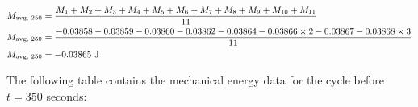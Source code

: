\documentclass[titlepage]{article}
\begin{document}
            \begin{equation}
                \small
                \begin{aligned}
                    M_{\text{avg, 250}} &= \frac{M_1 + M_2 + M_3 + M_4 + M_5 + M_6 + M_7 + M_8 + M_9 + M_{10} + M_{11}}{11} \\
                    M_{\text{avg, 250}} &= \frac{-0.03858 -0.03859 -0.03860 -0.03862 -0.03864 -0.03866 \times 2 -0.03867 -0.03868 \times 3 }{11} \\
                    M_{\text{avg, 250}} &= -0.03865 \text{ J} \\
                \end{aligned}\label{eq:average-mechanical-energy-cycle-at-250-seconds}
            \end{equation}
            
            The following table contains the mechanical energy data for the cycle before $t=350$ seconds:
            
\end{document}

